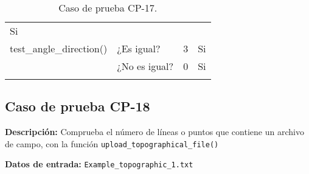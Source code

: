 \begin{longtable}[]{@{}llll@{}}
\begin{minipage}[t]{0.05\columnwidth}
Si\strut
\end{minipage}\tabularnewline
\begin{minipage}[t]{0.5\columnwidth}\raggedright\strut
test\_angle\_direction()\strut
\end{minipage} & \begin{minipage}[t]{0.20\columnwidth}\raggedright\strut
¿Es igual?\strut
\end{minipage} & \begin{minipage}[t]{0.15\columnwidth}\raggedright\strut
3\strut
\end{minipage} & \begin{minipage}[t]{0.05\columnwidth}\raggedright\strut
Si\strut
\end{minipage}\tabularnewline
\begin{minipage}[t]{0.5\columnwidth}\raggedright\strut
\strut
\end{minipage} & \begin{minipage}[t]{0.20\columnwidth}\raggedright\strut
¿No es igual?\strut
\end{minipage} & \begin{minipage}[t]{0.15\columnwidth}\raggedright\strut
0\strut
\end{minipage} & \begin{minipage}[t]{0.05\columnwidth}\raggedright\strut
Si\strut
\end{minipage}\tabularnewline
\bottomrule
\caption{Caso de prueba CP-17.}
\end{longtable}

\subsection{Caso de prueba CP-18}

\textbf{Descripción:} Comprueba el número de líneas o puntos que contiene un archivo de campo, con la función \texttt{upload\_topographical\_file()}

\textbf{Datos de entrada:} \texttt{Example\_topographic\_1.txt}



